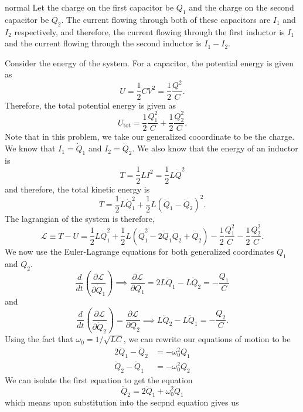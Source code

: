 \begin{solution}{normal}
Let the charge on the first capacitor be $Q_1$ and the charge on the second capacitor be $Q_2$. The current flowing through both of these capacitors are $I_1$ and $I_2$ respectively, and therefore, the current flowing through the first inductor is $I_1$ and the current flowing through the second inductor is $I_1 - I_2$. 
\begin{center}
\end{center}
Consider the energy of the system. For a capacitor, the potential energy is given as 
\[U = \frac{1}{2}CV^2 = \frac{1}{2}\frac{Q^2}{C}.\]
Therefore, the total potential energy is given as 
\[U_{\text{tot}} = \frac{1}{2}\frac{Q_1^2}{C} + \frac{1}{2}\frac{Q_2^2}{C}.\]
Note that in this problem, we take our generalized cooordinate to be the charge. We know that $I_1 = \dot{Q}_1$ and $I_2 = \dot{Q}_2$. We also know that the energy of an inductor is 
\[T = \frac{1}{2}LI^2 = \frac{1}{2}L\dot{Q}^2\]
and therefore, the total kinetic energy is 
\[T = \frac{1}{2}L\dot{Q}_1^2 + \frac{1}{2}L(\dot{Q}_1 - \dot{Q}_2)^2.\]
The lagrangian of the system is therefore, 
\[\mathcal{L} \equiv T - U = \frac{1}{2}L\dot{Q}_1^2 + \frac{1}{2}L(\dot{Q}_1^2 - 2\dot{Q}_1\dot{Q}_2 + \dot{Q}_2) - \frac{1}{2}\frac{Q_1^2}{C} - \frac{1}{2}\frac{Q_2^2}{C}.\]
We now use the Euler-Lagrange equations for both generalized coordinates $Q_1$ and $Q_2$.
\[\frac{d}{dt}\left(\frac{\partial\mathcal{L}}{\partial \dot{Q}_1}\right) \implies \frac{\partial \mathcal{L}}{\partial Q_1} = 2L\ddot{Q}_1 - L\ddot{Q}_2 = -\frac{Q_1}{C}\]and
\[\frac{d}{dt}\left(\frac{\partial\mathcal{L}}{\partial \dot{Q}_2}\right) = \frac{\partial \mathcal{L}}{\partial Q_2} \implies L\ddot{Q}_2 - L\ddot{Q}_1 = -\frac{Q_2}{C}.\]
Using the fact that $\omega_0 = 1/\sqrt{LC}$, we can rewrite our equations of motion to be 
\begin{align*}
2\ddot{Q}_1 - \ddot{Q}_2 &= -\omega_0^2 Q_1 \\
\ddot{Q}_2 - \ddot{Q}_1 &= -\omega_0^2 Q_2
\end{align*}
We can isolate the first equation to get the equation 
\[\ddot{Q}_2 = 2\ddot{Q}_1 + \omega_0^2 Q_1\]
which means upon substitution into the secpnd equation gives us 

\end{solution}
